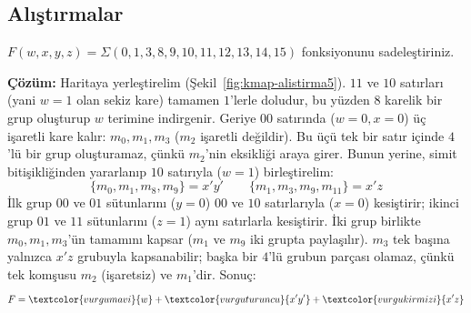 \subsection{Alıştırmalar}\label{sec:kmap-dort-alistirmalar}
\begin{alistirma}[\orta]
$F(w,x,y,z)=\Sigma(0,1,3,8,9,10,11,12,13,14,15)$ fonksiyonunu sadeleştiriniz.
\end{alistirma}

\noindent\textbf{Çözüm:} Haritaya yerleştirelim (Şekil~\ref{fig:kmap-alistirma5}). $11$ ve
$10$ satırları (yani $w=1$ olan sekiz kare) tamamen $1$'lerle doludur, bu yüzden $8$
karelik bir grup oluşturup $w$ terimine indirgenir. Geriye $00$ satırında ($w=0,x=0$) üç
işaretli kare kalır: $m_0,m_1,m_3$ ($m_2$ işaretli değildir). Bu üçü tek bir satır içinde
$4$'lü bir grup oluşturamaz, çünkü $m_2$'nin eksikliği araya girer. Bunun yerine, simit
bitişikliğinden yararlanıp $10$ satırıyla ($w=1$) birleştirelim:
\[
\{m_0,m_1,m_8,m_9\}=x'y' \qquad \{m_1,m_3,m_9,m_{11}\}=x'z
\]
İlk grup $00$ ve $01$ sütunlarını ($y=0$) $00$ ve $10$ satırlarıyla ($x=0$) kesiştirir;
ikinci grup $01$ ve $11$ sütunlarını ($z=1$) aynı satırlarla kesiştirir. İki grup birlikte
$m_0,m_1,m_3$'ün tamamını kapsar ($m_1$ ve $m_9$ iki grupta paylaşılır). $m_3$ tek başına
yalnızca $x'z$ grubuyla kapsanabilir; başka bir $4$'lü grubun parçası olamaz, çünkü tek
komşusu $m_2$ (işaretsiz) ve $m_1$'dir. Sonuç:
\[
F = \textcolor{vurgumavi}{w} + \textcolor{vurguturuncu}{x'y'} + \textcolor{vurgukirmizi}{x'z}
\]
